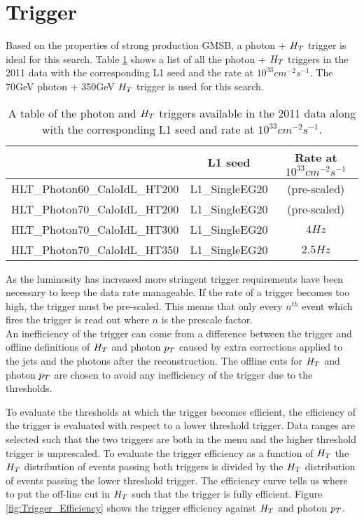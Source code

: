 \section{Trigger}

Based on the properties of strong production GMSB, a photon + $H_{T}$ trigger 
is ideal for this search. Table \ref{tab:Triggers} shows a list of all the 
photon + $H_{T}$ triggers in the 2011 data with the corresponding L1 seed and the
rate at $10^{33}\unit{cm^{-2}s^{-1}}$. The 70\unit{GeV} photon + 350\unit{GeV}
$H_{T}$ trigger is used for this search. \\

\begin{table}
\begin{center}
\begin{tabular}{|l|c|c|}
\hline
 & L1 seed & Rate at $10^{33}\unit{cm^{-2}s^{-1}}$ \\
\hline
HLT\_Photon60\_CaloIdL\_HT200 & L1\_SingleEG20 & (pre-scaled) \\
HLT\_Photon70\_CaloIdL\_HT200 & L1\_SingleEG20 & (pre-scaled) \\
HLT\_Photon70\_CaloIdL\_HT300 & L1\_SingleEG20 & $4\unit{Hz}$ \\
HLT\_Photon70\_CaloIdL\_HT350 & L1\_SingleEG20 & $2.5\unit{Hz}$ \\
\hline
\end{tabular}
\end{center}
\caption{A table of the photon and $H_{T}$ triggers available in the 2011 data
along with the corresponding L1 seed and rate at $10^{33}\unit{cm^{-2}s^{-1}}$.}
\label{tab:Triggers}
\end{table}

As the luminosity has increased more stringent trigger requirements have been 
necessary to keep the data rate manageable. If the rate of a trigger becomes too
high, the trigger must be pre-scaled. This means that only every $n^{th}$ event 
which fires the trigger is read out where $n$ is the prescale factor. \\

An inefficiency of the trigger can come from a difference between the trigger 
and offline definitions of $H_{T}$ and photon $p_{T}$ caused by extra corrections
applied to the jets and the photons after the reconstruction. The offline cuts 
for $H_{T}$ and photon $p_{T}$ are chosen to avoid any inefficiency of the trigger 
due to the thresholds.

To evaluate the thresholds at which the trigger becomes efficient, the
efficiency of the trigger is evaluated with respect to a lower threshold 
trigger. Data ranges are selected such that the two triggers are both in the
menu and the higher threshold trigger is unprescaled. To evaluate the trigger
efficiency as a function of $H_{T}$ the $H_{T}$ distribution of events passing both
triggers is divided by the $H_{T}$ distribution of events passing the lower
threshold trigger. The efficiency curve tells us where to put the off-line cut 
in $H_{T}$ such that the trigger is fully efficient. Figure 
\ref{fig:Trigger_Efficiency} shows the trigger efficiency against $H_{T}$ and 
photon $p_{T}$.

